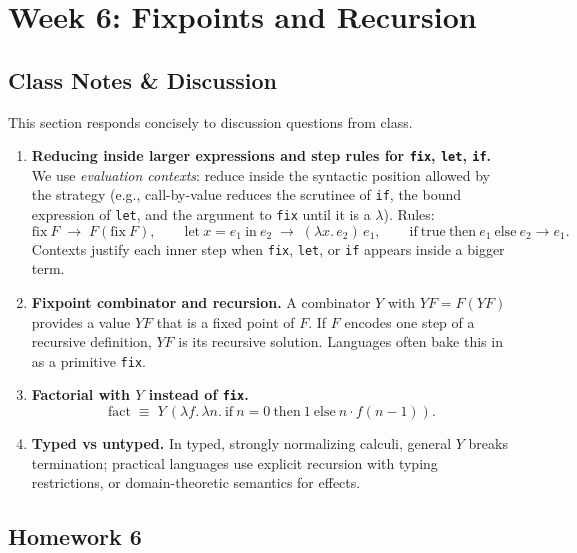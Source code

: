 \documentclass{article}
\theoremstyle{theorem}
\theoremstyle{definition}
\theoremstyle{remark}
\begin{document}
\section{Week 6: Fixpoints and Recursion}

\subsection{Class Notes \& Discussion}
This section responds concisely to discussion questions from class.

\begin{enumerate}
  \item \textbf{Reducing inside larger expressions and step rules for \texttt{fix}, \texttt{let}, \texttt{if}.}
  We use \emph{evaluation contexts}: reduce inside the syntactic position allowed by the strategy (e.g., call-by-value reduces the scrutinee of \texttt{if}, the bound expression of \texttt{let}, and the argument to \texttt{fix} until it is a $\lambda$). Rules:
  \[
  \mathrm{fix}\ F \;\to\; F(\mathrm{fix}\ F),\qquad
  \mathrm{let}\ x=e_1\ \mathrm{in}\ e_2 \;\to\; (\lambda x.\,e_2)\,e_1,\qquad
  \mathrm{if}\ \text{true}\ \text{then}\ e_1\ \text{else}\ e_2 \to e_1.
  \]
  Contexts justify each inner step when \texttt{fix}, \texttt{let}, or \texttt{if} appears inside a bigger term.

  \item \textbf{Fixpoint combinator and recursion.}
  A combinator $Y$ with $YF = F(YF)$ provides a value $YF$ that is a fixed point of $F$. If $F$ encodes one step of a recursive definition, $YF$ is its recursive solution. Languages often bake this in as a primitive \texttt{fix}.

  \item \textbf{Factorial with $Y$ instead of \texttt{fix}.}
  \[
  \mathrm{fact} \;\equiv\; Y\,(\lambda f.\,\lambda n.\ \mathrm{if}\ n=0\ \mathrm{then}\ 1\ \mathrm{else}\ n \cdot f(n-1)).
  \]

  \item \textbf{Typed vs untyped.} In typed, strongly normalizing calculi, general $Y$ breaks termination; practical languages use explicit recursion with typing restrictions, or domain-theoretic semantics for effects.
\end{enumerate}

\subsection{Homework 6}
\end{document}
